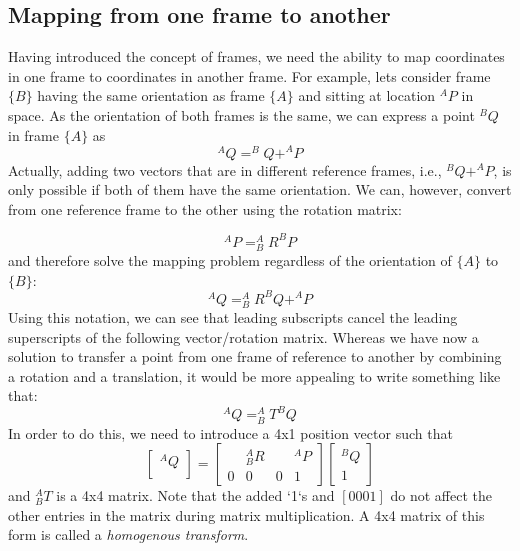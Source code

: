 \subsection{Mapping from one frame to another}
Having introduced the concept of frames, we need the ability to map coordinates in one frame to coordinates in another frame. For example, lets consider frame $\{B\}$ having the same orientation as frame $\{A\}$ and sitting at location $^AP$ in space. As the orientation of both frames is the same, we can express a point $ ^BQ$ in frame $\{A\}$ as
%
\begin{equation}
^AQ=^BQ+^AP
\end{equation}
%
Actually, adding two vectors that are in different reference frames, i.e., $ ^BQ+^AP$, is only possible if both of them have the same orientation. We can, however, convert from one reference frame to the other using the rotation matrix:

\begin{equation}
^AP=^A_BR^BP
\end{equation}
%
and therefore solve the mapping problem regardless of the orientation of $\{A\}$ to $\{B\}$:
\begin{equation}
^AQ=^A_BR^BQ+^AP
\end{equation}
Using this notation, we can see that leading subscripts cancel the leading superscripts of the following vector/rotation matrix. Whereas we have now a solution to transfer a point from one frame of reference to another by combining a rotation and a translation, it would be more appealing to write something like that:
\begin{equation}
^AQ=^A_BT^BQ
\end{equation}
In order to do this, we need to introduce a 4x1 position vector such that
\begin{equation}
\left[\begin{array}{c}^AQ\\\end{array}\right]=\left[\begin{array}{ccc|c} & ^A_BR & & ^AP \\\hline 0 & 0 & 0 & 1\end{array}\right]\left[\begin{array}{c}^BQ\\1\end{array}\right]
\end{equation}
and $^A_BT$ is a 4x4 matrix.  Note that the added `1`s and $ [0 0 0 1]$ do not affect the other entries in the matrix during matrix multiplication. A 4x4 matrix of this form is called a \emph{homogenous transform}.

